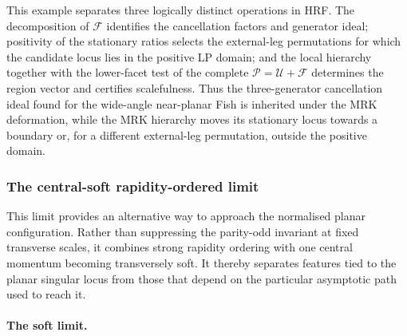 \documentclass[a4paper,11pt]{article}
\begin{document}
This example separates three logically distinct operations in HRF.  The
decomposition of \(\mathcal F\) identifies the cancellation factors and
generator ideal; positivity of the stationary ratios selects the external-leg
permutations for which the candidate locus lies in the positive LP domain;
and the local hierarchy together with the lower-facet test of the complete
\(\mathcal P=\mathcal U+\mathcal F\) determines the region vector and
certifies scalefulness.  Thus the three-generator cancellation ideal found for
the wide-angle near-planar Fish is inherited under the MRK deformation, while
the MRK hierarchy moves its stationary locus towards a boundary or, for a
different external-leg permutation, outside the positive domain.

\subsubsection{The central-soft rapidity-ordered limit}
\label{sec:five-point-central-soft-status}

This limit provides an alternative way to approach the normalised planar
configuration.  Rather than suppressing the parity-odd invariant at fixed
transverse scales, it combines strong rapidity ordering with one central
momentum becoming transversely soft.  It thereby separates features tied to
the planar singular locus from those that depend on the particular
asymptotic path used to reach it.

\paragraph{The soft limit.}
\end{document}
